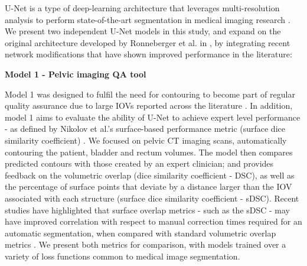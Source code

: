 U-Net is a type of deep-learning architecture that leverages multi-resolution analysis to perform state-of-the-art segmentation in medical imaging research \cite{Kazemifar_2018, Zhu_2018}. We present two independent U-Net models in this study, and expand on the original architecture developed by Ronneberger et al. in \cite{Ronneberger_2015}, by integrating recent network  modifications that have shown improved performance in the literature: 

\textbf{Model 1 - Pelvic imaging QA tool}

Model 1 was designed to fulfil the need for contouring to become part of regular quality assurance due to large IOVs reported across the literature \cite{Vinod_2016}. In addition, model 1 aims to evaluate the ability of U-Net to achieve expert level performance - as defined by Nikolov et al.'s surface-based performance metric (surface dice similarity coefficient) \cite{Nikolov_2018}. We focused on pelvic CT imaging scans, automatically contouring the patient, bladder and rectum volumes. The model then compares predicted contours with those created by an expert clinician; and provides feedback on the volumetric overlap (dice similarity coefficient - DSC), as well as the percentage of surface points that deviate by a distance larger than the IOV associated with each structure (surface dice similarity coefficient - sDSC). Recent studies have highlighted that surface overlap metrics - such as the sDSC - may have improved correlation with respect to manual correction times required for an automatic segmentation, when compared with standard volumetric overlap metrics \cite{Vaassen_2020}. We present both metrics for comparison, with models trained over a variety of loss functions common to medical image segmentation.

